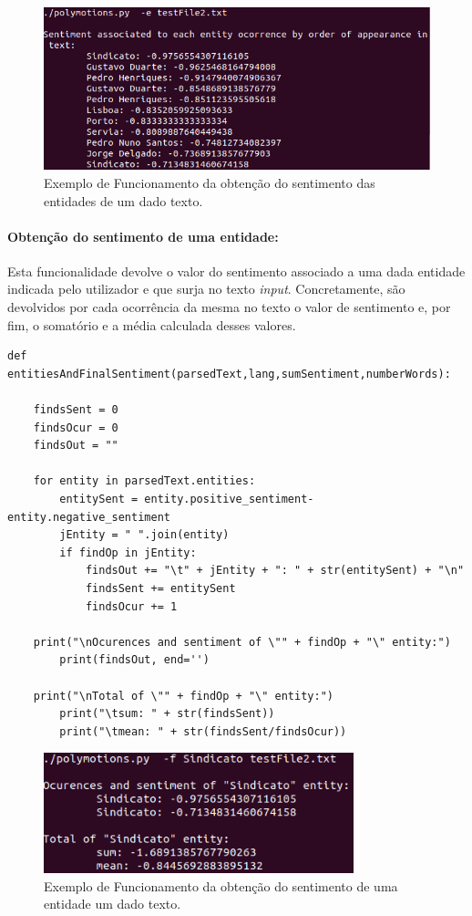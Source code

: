 \documentclass{article}
\begin{document}
\begin{figure}[H]
\begin{center}
    \includegraphics[width = 12cm, keepaspectratio]{Pictures/e.png}
    \caption{Exemplo de Funcionamento da obtenção do sentimento das entidades de um dado texto. }
    \label{fig:eoption}
\end{center}
\end{figure}

\paragraph{Obtenção do sentimento de uma entidade:} Esta funcionalidade devolve o valor do sentimento associado a uma dada entidade indicada pelo utilizador e que surja no texto \textit{input}. Concretamente, são devolvidos por cada ocorrência da mesma no texto o valor de sentimento e, por fim, o somatório e a média calculada desses valores.

\begin{verbatim}
def entitiesAndFinalSentiment(parsedText,lang,sumSentiment,numberWords):
    
    findsSent = 0
    findsOcur = 0
    findsOut = ""

    for entity in parsedText.entities:
        entitySent = entity.positive_sentiment-entity.negative_sentiment
        jEntity = " ".join(entity)
        if findOp in jEntity:
            findsOut += "\t" + jEntity + ": " + str(entitySent) + "\n"
            findsSent += entitySent
            findsOcur += 1

    print("\nOcurences and sentiment of \"" + findOp + "\" entity:")
        print(findsOut, end='')
    
    print("\nTotal of \"" + findOp + "\" entity:")
        print("\tsum: " + str(findsSent))
        print("\tmean: " + str(findsSent/findsOcur))
\end{verbatim}

\begin{figure}[H]
\begin{center}
    \includegraphics[width = 9cm, keepaspectratio]{Pictures/f.png}
    \caption{Exemplo de Funcionamento da obtenção do sentimento de uma entidade um dado texto. }
    \label{fig:foption}
\end{center}
\end{figure}
\end{document}

